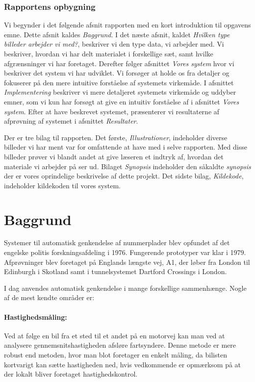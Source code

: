 \subsubsection*{Rapportens opbygning}
Vi begynder i det følgende afsnit rapporten med en kort introduktion til opgavens emne. Dette afsnit kaldes \textit{Baggrund}. I det næste afsnit, kaldet \textit{Hvilken type billeder arbejder vi med?}, beskriver vi den type data, vi arbejder med. Vi beskriver, hvordan vi har delt materialet i forskellige sæt, samt hvilke afgrænsninger vi har foretaget. Derefter følger afsnittet \textit{Vores system} hvor vi beskriver det system vi har udviklet. Vi forsøger at holde os fra detaljer og fokuserer på den mere intuitive forståelse af systemets virkemåde. I afsnittet \textit{Implementering} beskriver vi mere detaljeret systemets virkemåde og uddyber emner, som vi kun har forsøgt at give en intuitiv forståelse af i afsnittet \textit{Vores system}. Efter at have beskrevet systemet, præsenterer vi resultaterne af afprøvning af systemet i afsnittet \textit{Resultater}.

Der er tre bilag til rapporten. Det første, \textit{Illustrationer}, indeholder diverse billeder vi har ment var for omfattende at have med i selve rapporten. Med disse billeder prøver vi blandt andet at give læseren et indtryk af, hvordan det materiale vi arbejder på ser ud. Bilaget \textit{Synopsis} indeholder den såkaldte \textit{synopsis} der er vores oprindelige beskrivelse af dette projekt. Det sidste bilag, \textit{Kildekode}, indeholder kildekoden til vores system.

\section{Baggrund}
Systemer til automatisk genkendelse af nummerplader blev opfundet af det engelske politis forskningsafdeling i 1976. Fungerende prototyper var klar i 1979. Afprøvninger blev foretaget på Englands længste vej, A1, der løber fra London til Edinburgh i Skotland samt i tunnelsystemet Dartford Crossings i London\cite{wiki_baggrund}. 

I dag anvendes automatisk genkendelse i mange forskellige sammenhænge. Nogle af de mest kendte områder er:

\paragraph{Hastighedsmåling:}
Ved at følge en bil fra et sted til et andet på en motorvej kan man ved at analysere gennemsnitshastigheden afsløre fartsyndere. Denne metode er mere robust end metoden, hvor man blot foretager en enkelt måling, da bilisten kortvarigt kan sætte hastigheden ned, hvis vedkommende er opmærksom på at der lokalt bliver foretaget hastighedskontrol.

